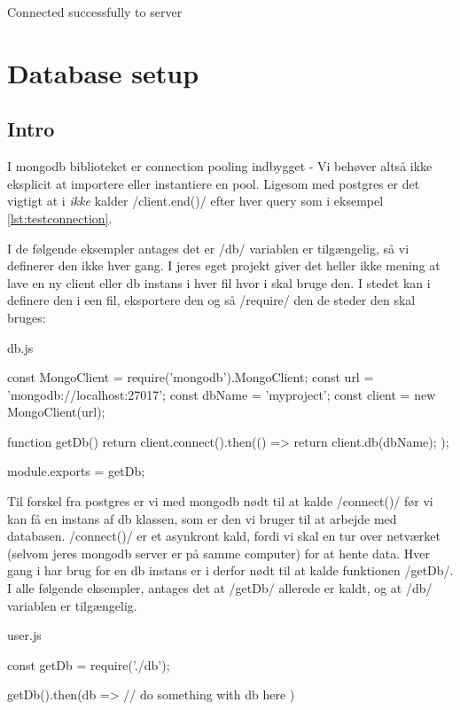\documentclass[english,course]{lecture}
\begin{document}
\begin{bashcode}
Connected successfully to server
\end{bashcode}

\section{Database setup}
\subsection{Intro}

I mongodb biblioteket er connection pooling indbygget - Vi behøver altså ikke eksplicit at importere eller instantiere en pool. Ligesom med postgres er det vigtigt at i \textit{ikke} kalder \jsinline/client.end()/ efter hver query som i eksempel \ref{lst:testconnection}.

I de følgende eksempler antages det er \jsinline/db/ variablen er tilgængelig, så vi definerer den ikke hver gang. I jeres eget projekt giver det heller ikke mening at lave en ny client eller db instans i hver fil hvor i skal bruge den. I stedet kan i definere den i een fil, eksportere den og så \jsinline/require/ den de steder den skal bruges:

\begin{listing}[H]
\caption{db.js}
\begin{jscode}
const MongoClient = require('mongodb').MongoClient;
const url = 'mongodb://localhost:27017';
const dbName = 'myproject';
const client = new MongoClient(url);

function getDb() {
	return client.connect().then(() => {
		return client.db(dbName);
	});	
}

module.exports = getDb;
\end{jscode}
\end{listing}

Til forskel fra postgres er vi med mongodb nødt til at kalde \jsinline/connect()/ før vi kan få en instans af db klassen, som er den vi bruger til at arbejde med databasen. \jsinline/connect()/ er et asynkront kald, fordi vi skal en tur over netværket (selvom jeres mongodb server er på samme computer) for at hente data. Hver gang i har brug for en db instans er i derfor nødt til at kalde funktionen \jsinline/getDb/. I alle følgende eksempler, antages det at \jsinline/getDb/ allerede er kaldt, og at \jsinline/db/ variablen er tilgængelig.

\begin{listing}[H]
\caption{user.js}
\begin{jscode}
const getDb = require('./db');

getDb().then(db => {
	// do something with db here
})
\end{jscode}
\end{listing}
\end{document}
